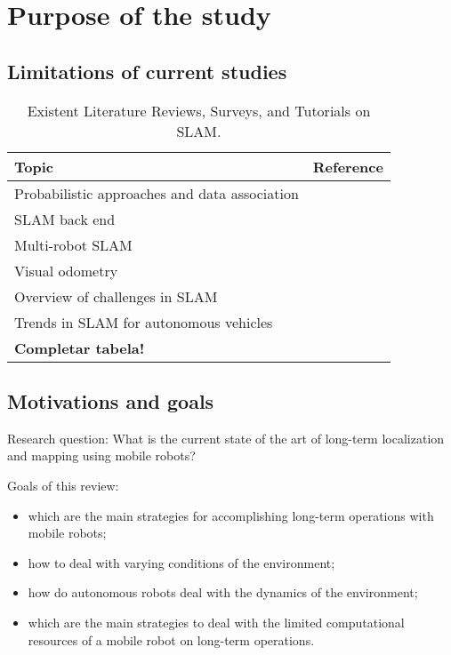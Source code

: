 \section{Purpose of the study}
\label{sec:purpose}

\subsection{Limitations of current studies}

\begin{table}[h]
  \renewcommand{\arraystretch}{1.2}
  \setlength{\tabcolsep}{1.75pt}
  \caption[Existent Literature Reviews, Surveys, and Tutorials on SLAM.]{Existent Literature Reviews, Surveys, and Tutorials on SLAM.}
  \label{tab:purpose:current-literature}
  \centering
  {\scriptsize
  \begin{tabular}{p{} p{}}

\hline
\textbf{Topic} & \textbf{Reference}\\
\hline
Probabilistic approaches and data association%
& \cite{background:slam:durrant-whyte-bailey,background:slam:bailey-durrant-whyte}\\
SLAM back end%
& \cite{background:slam:grisetti}\\
Multi-robot SLAM%
& \cite{review:saeedi:2016}\\
Visual odometry%
& \cite{background:slam:scaramuzza-fraundorfer,background:slam:fraundorfer-scaramuzza}\\
Overview of challenges in SLAM%
& \cite{review:cadena:2016}\\
Trends in SLAM for autonomous vehicles%
& \cite{review:bresson:2017}\\
\textbf{Completar tabela!}\\
\hline

  \end{tabular}}
\end{table}

\subsection{Motivations and goals}

Research question: What is the current state of the art of long-term localization and mapping using mobile robots?

Goals of this review:

\begin{itemize}[nosep]
\item which are the main strategies for accomplishing long-term operations with mobile robots;
\item how to deal with varying conditions of the environment;
\item how do autonomous robots deal with the dynamics of the environment;
\item which are the main strategies to deal with the limited computational resources of a mobile robot on long-term operations.
\end{itemize}

